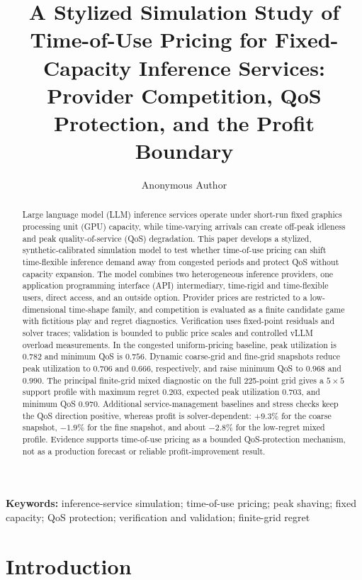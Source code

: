 \documentclass[11pt,a4paper]{article}
\title{\textbf{A Stylized Simulation Study of Time-of-Use Pricing for Fixed-Capacity Inference Services:\\
Provider Competition, QoS Protection, and the Profit Boundary}}
\author{Anonymous Author}
\date{}
\begin{document}
\maketitle

\begin{abstract}
Large language model (LLM) inference services operate under short-run fixed graphics processing unit (GPU) capacity, while time-varying arrivals can create off-peak idleness and peak quality-of-service (QoS) degradation. This paper develops a stylized, synthetic-calibrated simulation model to test whether time-of-use pricing can shift time-flexible inference demand away from congested periods and protect QoS without capacity expansion. The model combines two heterogeneous inference providers, one application programming interface (API) intermediary, time-rigid and time-flexible users, direct access, and an outside option. Provider prices are restricted to a low-dimensional time-shape family, and competition is evaluated as a finite candidate game with fictitious play and regret diagnostics. Verification uses fixed-point residuals and solver traces; validation is bounded to public price scales and controlled vLLM overload measurements. In the congested uniform-pricing baseline, peak utilization is $0.782$ and minimum QoS is $0.756$. Dynamic coarse-grid and fine-grid snapshots reduce peak utilization to $0.706$ and $0.666$, respectively, and raise minimum QoS to $0.968$ and $0.990$. The principal finite-grid mixed diagnostic on the full 225-point grid gives a $5\times5$ support profile with maximum regret $0.203$, expected peak utilization $0.703$, and minimum QoS $0.970$. Additional service-management baselines and stress checks keep the QoS direction positive, whereas profit is solver-dependent: $+9.3\%$ for the coarse snapshot, $-1.9\%$ for the fine snapshot, and about $-2.8\%$ for the low-regret mixed profile. Evidence supports time-of-use pricing as a bounded QoS-protection mechanism, not as a production forecast or reliable profit-improvement result.
\end{abstract}

\noindent\textbf{Keywords:} inference-service simulation; time-of-use pricing; peak shaving; fixed capacity; QoS protection; verification and validation; finite-grid regret

\section{Introduction}
\label{sec:intro}
\end{document}
